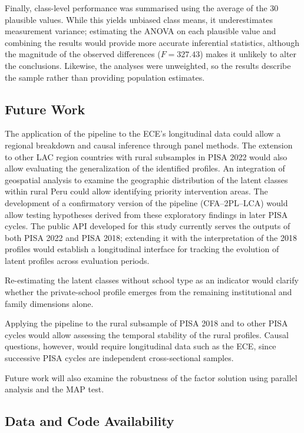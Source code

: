 \documentclass[runningheads]{llncs}
\begin{document}
Finally, class-level performance was summarised using the
average of the 30 plausible values. While this yields unbiased
class means, it underestimates measurement variance; estimating
the ANOVA on each plausible value and combining the results would
provide more accurate inferential statistics, although the
magnitude of the observed differences (\(F = 327.43\)) makes it
unlikely to alter the conclusions. Likewise, the analyses were
unweighted, so the results describe the sample rather than
providing population estimates.

\subsection{Future Work}

The application of the pipeline to the ECE's longitudinal data
could allow a regional breakdown and causal inference through
panel methods. The extension to other LAC region countries with
rural subsamples in PISA 2022 would also allow evaluating the
generalization of the identified profiles. An integration of
geospatial analysis to examine the geographic distribution of the
latent classes within rural Peru could allow identifying priority
intervention areas. The development of a confirmatory version of
the pipeline (CFA--2PL--LCA) would allow testing hypotheses
derived from these exploratory findings in later PISA cycles. The
public API developed for this study currently serves the outputs
of both PISA 2022 and PISA 2018; extending it with the
interpretation of the 2018 profiles would establish a
longitudinal interface for tracking the evolution of latent
profiles across evaluation periods.

Re-estimating the latent classes without school type as an
indicator would clarify whether the private-school profile
emerges from the remaining institutional and family dimensions
alone.

Applying the pipeline to the rural subsample of PISA 2018 and to
other PISA cycles would allow assessing the temporal stability of
the rural profiles. Causal questions, however, would require
longitudinal data such as the ECE, since successive PISA cycles
are independent cross-sectional samples.

Future work will also examine the robustness of the factor
solution using parallel analysis and the MAP test.

\subsection{Data and Code Availability}
\end{document}
